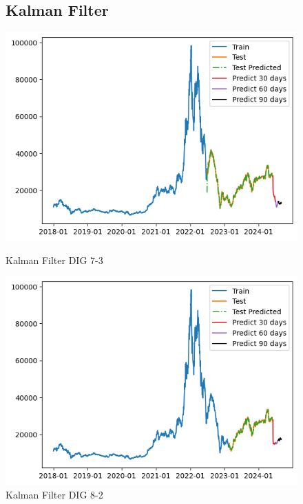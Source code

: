 \documentclass[conference]{IEEEtran}
\begin{document}
\begin{figure}[htbp]
\subsection{Kalman Filter}
\centering
    \begin{minipage}{0.23\textwidth}
    \centering
    \includegraphics[width=1\textwidth]{experiment/kf/DIG 7-3.png}
    \caption{Kalman Filter DIG 7-3}
    \label{fig:nvl_boxplot}
    \end{minipage}
    \hfill
    \begin{minipage}{0.23\textwidth}
    \centering
    \includegraphics[width=1\textwidth]{experiment/kf/dig 8-2.png}
    \caption{Kalman Filter DIG 8-2}
    \label{fig:nvl_histogram}
    \end{minipage}

\end{figure}
\end{document}
